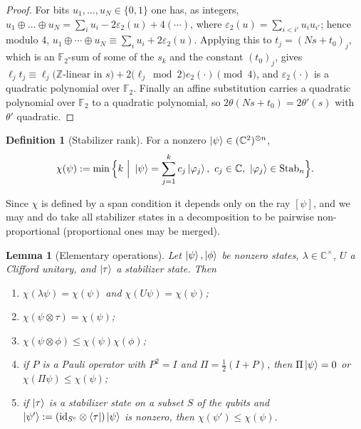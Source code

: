 \documentclass[11pt]{article}
\theoremstyle{plain}
\newtheorem{lemma}[theorem]{Lemma}
\theoremstyle{definition}
\newtheorem{definition}[theorem]{Definition}
\newcommand{\F}{\mathbb{F}}
\newcommand{\Z}{\mathbb{Z}}
\newcommand{\C}{\mathbb{C}}
\newcommand{\Stab}{\mathrm{Stab}}
\begin{document}
\begin{proof}
For bits $u_1,\dots,u_N\in\{0,1\}$ one has, as integers,
$u_1\oplus\dots\oplus u_N=\sum_i u_i-2\varepsilon_2(u)+4(\cdots)$, where
$\varepsilon_2(u)=\sum_{i<i'}u_iu_{i'}$; hence modulo $4$,
$u_1\oplus\cdots\oplus u_N\equiv\sum_iu_i+2\varepsilon_2(u)$. Applying this to
$t_j=(Ns+t_0)_j$, which is an $\F_2$-sum of some of the $s_k$ and the constant
$(t_0)_j$, gives
$\ell_jt_j\equiv \ell_j\big(\text{$\Z$-linear in }s\big)+2\big(\ell_j\bmod 2\big)e_2(\cdot)\pmod 4$,
and $\varepsilon_2(\cdot)$ is a quadratic polynomial over $\F_2$. Finally an affine substitution
carries a quadratic polynomial over $\F_2$ to a quadratic polynomial, so
$2\theta(Ns+t_0)=2\theta'(s)$ with $\theta'$ quadratic.
\end{proof}

\begin{definition}[Stabilizer rank]\label{def:chi}
For a nonzero $\ket\psi\in(\C^2)^{\otimes n}$,
\[
\chi(\psi):=\min\Big\{k\ \Big|\ \ket\psi=\sum_{j=1}^k c_j\ket{\varphi_j},\
c_j\in\C,\ \ket{\varphi_j}\in\Stab_n\Big\}.
\]
\end{definition}

Since $\chi$ is defined by a span condition it depends only on the ray $[\psi]$, and
we may and do take all stabilizer states in a decomposition to be pairwise
non-proportional (proportional ones may be merged).

\begin{lemma}[Elementary operations]\label{lem:ops}
Let $\ket\psi,\ket\phi$ be nonzero states, $\lambda\in\C^\times$, $U$ a Clifford
unitary, and $\ket\tau$ a stabilizer state. Then
\begin{enumerate}[label=(\alph*)]
\item $\chi(\lambda\psi)=\chi(\psi)$ and $\chi(U\psi)=\chi(\psi)$;
\item $\chi(\psi\otimes\tau)=\chi(\psi)$;
\item $\chi(\psi\otimes\phi)\le\chi(\psi)\chi(\phi)$;
\item if $P$ is a Pauli operator with $P^2=I$ and $\Pi=\tfrac12(I+P)$, then
$\Pi\ket\psi=0$ or $\chi(\Pi\psi)\le\chi(\psi)$;
\item if $\ket\tau$ is a stabilizer state on a subset $S$ of the qubits and
$\ket{\psi'}:=(\mathrm{id}_{S^c}\otimes\bra\tau)\ket\psi$ is nonzero, then
$\chi(\psi')\le\chi(\psi)$.
\end{enumerate}
\end{lemma}
\end{document}
